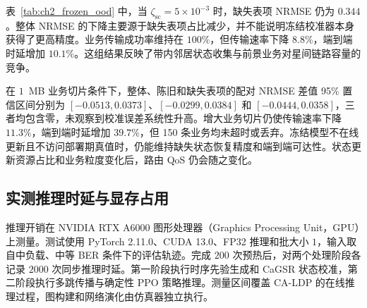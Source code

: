 \begin{table}[!htp]
\centering
{}
\label{tab:ch2_frozen_ood}
\footnotesize
\setlength{\tabcolsep}{3pt}
\renewcommand{\arraystretch}{1.13}
\end{table}

表~\ref{tab:ch2_frozen_ood} 中，当 $\zeta_{\mathrm{sc}}=5\times10^{-3}$ 时，缺失表项 NRMSE 仍为 $0.344$。整体 NRMSE 的下降主要源于缺失表项占比减少，并不能说明冻结校准器本身获得了更高精度。业务传输成功率维持在 $100\%$，但传输速率下降 $8.8\%$，端到端时延增加 $10.1\%$。这组结果反映了带内邻居状态收集与前景业务对星间链路容量的竞争。

在 $1$~MB 业务切片条件下，整体、陈旧和缺失表项的配对 NRMSE 差值 95\% 置信区间分别为 $[-0.0513,0.0373]$、$[-0.0299,0.0384]$ 和 $[-0.0444,0.0358]$，三者均包含零，未观察到校准误差系统性升高。增大业务切片仍使传输速率下降 $11.3\%$，端到端时延增加 $39.7\%$，但 150 条业务均未超时或丢弃。冻结模型不在线更新且不访问部署期真值时，仍能维持缺失状态恢复精度和端到端可达性。状态更新资源占比和业务粒度变化后，路由 QoS 仍会随之变化。

\subsection{实测推理时延与显存占用}
\label{subsec:ch2_exp_profile}

推理开销在 NVIDIA RTX A6000 图形处理器（Graphics Processing Unit，GPU）上测量。测试使用 PyTorch 2.11.0、CUDA 13.0、FP32 推理和批大小 $1$，输入取自中负载、中等 BER 条件下的评估轨迹。完成 $200$ 次预热后，对两个处理阶段各记录 $2000$ 次同步推理时延。第一阶段执行时序先验生成和 CaGSR 状态校准，第二阶段执行多跳传播与确定性 PPO 策略推理。测量区间覆盖 CA-LDP 的在线推理过程，图构建和网络演化由仿真器独立执行。

